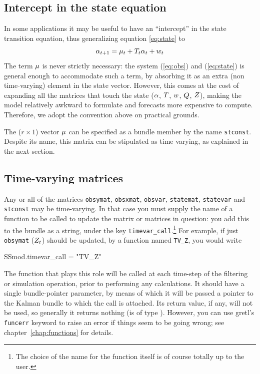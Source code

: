 \subsection{Intercept in the state equation}
\label{sec:stconst}

In some applications it may be useful to have an ``intercept'' in the
state transition equation, thus generalizing equation \eqref{eq:state}
to
\[
  \alpha_{t+1} = \mu_t + T_t \alpha_t + w_t \\
\]
The term $\mu$ is never strictly necessary: the system
(\ref{eq:obs}) and (\ref{eq:state}) is general enough to accommodate
such a term, by absorbing it as an extra (non time-varying) element in
the state vector.  However, this comes at the cost of expanding all
the matrices that touch the state ($\alpha$, $T$,
$w$, $Q$, $Z$), making the model relatively
awkward to formulate and forecasts more expensive to
compute. Therefore, we adopt the convention above on practical
grounds.

The ($r \times 1$) vector $\mu$ can be specified as a bundle
member by the name \texttt{stconst}. Despite its name, this matrix can
be stipulated as time varying, as explained in the next section.

\subsection{Time-varying matrices}
\label{sec:tvarying}

Any or all of the matrices \texttt{obsymat}, \texttt{obsxmat},
\texttt{obsvar}, \texttt{statemat}, \texttt{statevar} and
\texttt{stconst} may be time-varying.  In that case you must supply
the name of a function to be called to update the matrix or matrices
in question: you add this to the bundle as a string, under the key
\texttt{timevar\_call}.\footnote{The choice of the name for the
  function itself is of course totally up to the user.} For example,
if just \texttt{obsymat} ($Z_t$) should be updated, by a
function named \texttt{TV\_Z}, you would write
%
\begin{code}
SSmod.timevar_call = "TV_Z"
\end{code}
%
The function that plays this role will be called at each time-step of
the filtering or simulation operation, prior to performing any
calculations. It should have a single bundle-pointer parameter, by
means of which it will be passed a pointer to the Kalman bundle to
which the call is attached.  Its return value, if any, will not be
used, so generally it returns nothing (is of type ).
However, you can use gretl's \texttt{funcerr} keyword to raise an
error if things seem to be going wrong; see
chapter~\ref{chap:functions} for details.

